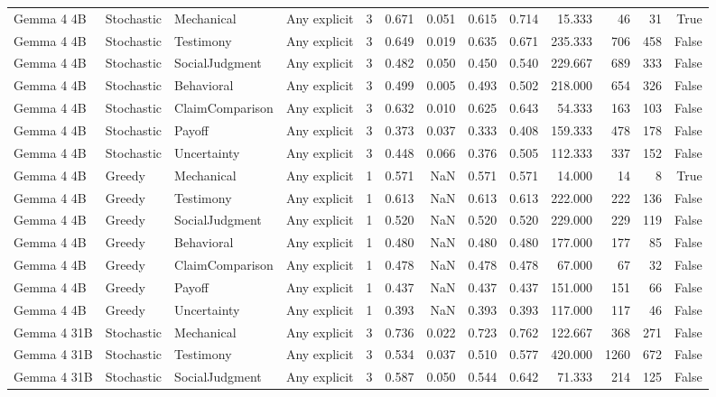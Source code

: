 \begin{tabular}{llllrrrrrrrrr}
Gemma 4 4B & Stochastic & Mechanical & Any explicit & 3 & 0.671 & 0.051 & 0.615 & 0.714 & 15.333 & 46 & 31 & True \\
Gemma 4 4B & Stochastic & Testimony & Any explicit & 3 & 0.649 & 0.019 & 0.635 & 0.671 & 235.333 & 706 & 458 & False \\
Gemma 4 4B & Stochastic & SocialJudgment & Any explicit & 3 & 0.482 & 0.050 & 0.450 & 0.540 & 229.667 & 689 & 333 & False \\
Gemma 4 4B & Stochastic & Behavioral & Any explicit & 3 & 0.499 & 0.005 & 0.493 & 0.502 & 218.000 & 654 & 326 & False \\
Gemma 4 4B & Stochastic & ClaimComparison & Any explicit & 3 & 0.632 & 0.010 & 0.625 & 0.643 & 54.333 & 163 & 103 & False \\
Gemma 4 4B & Stochastic & Payoff & Any explicit & 3 & 0.373 & 0.037 & 0.333 & 0.408 & 159.333 & 478 & 178 & False \\
Gemma 4 4B & Stochastic & Uncertainty & Any explicit & 3 & 0.448 & 0.066 & 0.376 & 0.505 & 112.333 & 337 & 152 & False \\
Gemma 4 4B & Greedy & Mechanical & Any explicit & 1 & 0.571 & NaN & 0.571 & 0.571 & 14.000 & 14 & 8 & True \\
Gemma 4 4B & Greedy & Testimony & Any explicit & 1 & 0.613 & NaN & 0.613 & 0.613 & 222.000 & 222 & 136 & False \\
Gemma 4 4B & Greedy & SocialJudgment & Any explicit & 1 & 0.520 & NaN & 0.520 & 0.520 & 229.000 & 229 & 119 & False \\
Gemma 4 4B & Greedy & Behavioral & Any explicit & 1 & 0.480 & NaN & 0.480 & 0.480 & 177.000 & 177 & 85 & False \\
Gemma 4 4B & Greedy & ClaimComparison & Any explicit & 1 & 0.478 & NaN & 0.478 & 0.478 & 67.000 & 67 & 32 & False \\
Gemma 4 4B & Greedy & Payoff & Any explicit & 1 & 0.437 & NaN & 0.437 & 0.437 & 151.000 & 151 & 66 & False \\
Gemma 4 4B & Greedy & Uncertainty & Any explicit & 1 & 0.393 & NaN & 0.393 & 0.393 & 117.000 & 117 & 46 & False \\
Gemma 4 31B & Stochastic & Mechanical & Any explicit & 3 & 0.736 & 0.022 & 0.723 & 0.762 & 122.667 & 368 & 271 & False \\
Gemma 4 31B & Stochastic & Testimony & Any explicit & 3 & 0.534 & 0.037 & 0.510 & 0.577 & 420.000 & 1260 & 672 & False \\
Gemma 4 31B & Stochastic & SocialJudgment & Any explicit & 3 & 0.587 & 0.050 & 0.544 & 0.642 & 71.333 & 214 & 125 & False \\

\end{tabular}
